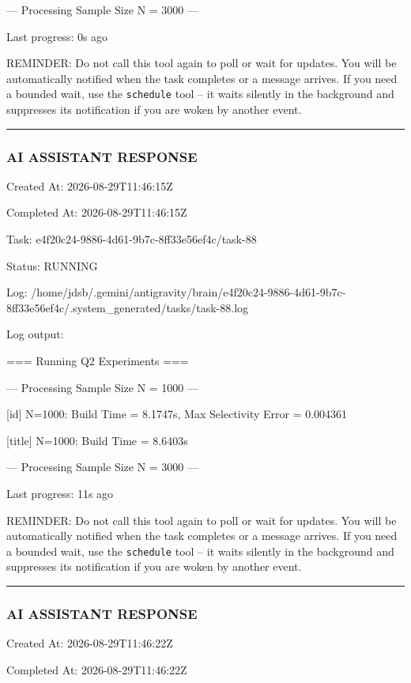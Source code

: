 \documentclass[11pt,a4paper]{article}
\begin{document}
{--- Processing Sample Size N = 3000 ---


Last progress: 0s ago



REMINDER: Do not call this tool again to poll or wait for updates. You will be automatically notified when the task completes or a message arrives. If you need a bounded wait, use the \texttt{schedule} tool -- it waits silently in the background and suppresses its notification if you are woken by another event.


\hrule

\subsubsection{AI ASSISTANT RESPONSE}

Created At: 2026-08-29T11:46:15Z

Completed At: 2026-08-29T11:46:15Z

Task: e4f20c24-9886-4d61-9b7c-8ff33e56ef4c/task-88

Status: RUNNING

Log: /home/jdsb/.gemini/antigravity/brain/e4f20c24-9886-4d61-9b7c-8ff33e56ef4c/.system\_generated/tasks/task-88.log

Log output:

=== Running Q2 Experiments ===


--- Processing Sample Size N = 1000 ---

[id] N=1000: Build Time = 8.1747s, Max Selectivity Error = 0.004361

[title] N=1000: Build Time = 8.6403s


--- Processing Sample Size N = 3000 ---


Last progress: 11s ago



REMINDER: Do not call this tool again to poll or wait for updates. You will be automatically notified when the task completes or a message arrives. If you need a bounded wait, use the \texttt{schedule} tool -- it waits silently in the background and suppresses its notification if you are woken by another event.


\hrule

\subsubsection{AI ASSISTANT RESPONSE}

Created At: 2026-08-29T11:46:22Z

Completed At: 2026-08-29T11:46:22Z

}
\end{document}
